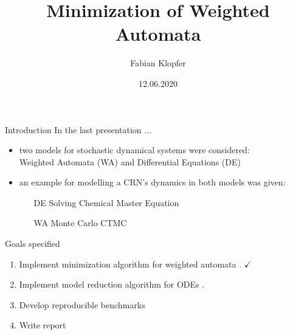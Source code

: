 \documentclass[rgb, pdf]{beamer}
\title{Minimization of Weighted Automata}
\author{Fabian Klopfer}
\date{12.06.2020}
\institute{Modelling of Complex Self-Organizing Systems Group}
\begin{document}
    \begin{frame}
        \titlepage
    \end{frame}

    \begin{frame}{Introduction}
        In the last presentation $\dots$ \\ \vspace{0.5cm}
        \begin{itemize}
            \item two models for stochastic dynamical systems were considered: \\ \vspace{0.2cm} 
                Weighted Automata (WA) and Differential Equations (DE)\\ \vspace{0.8cm} 
            \item an example for modelling a CRN's dynamics in both models was given: \\
            \vspace{0.3cm} 
            \begin{itemize}
             \item[DE] Solving Chemical Master Equation 
             \item[WA] Monte Carlo CTMC
            \end{itemize}
        \end{itemize}
    \end{frame}
    \begin{frame}{Goals specified}
        \begin{enumerate}
            \item Implement minimization algorithm for weighted automata \autocite{Kiefer2013OnTC}. {\Huge $\checkmark$ }  \\ \vspace{0.7cm}
            \item Implement model reduction algorithm for ODEs \autocite{Cardelli2017MaximalAO}.  \\ \vspace{0.7cm}
            \item Develop reproducible benchmarks  \\ \vspace{0.7cm}
            \item Write report \\
        \end{enumerate}
    \end{frame}
    
\end{document}

